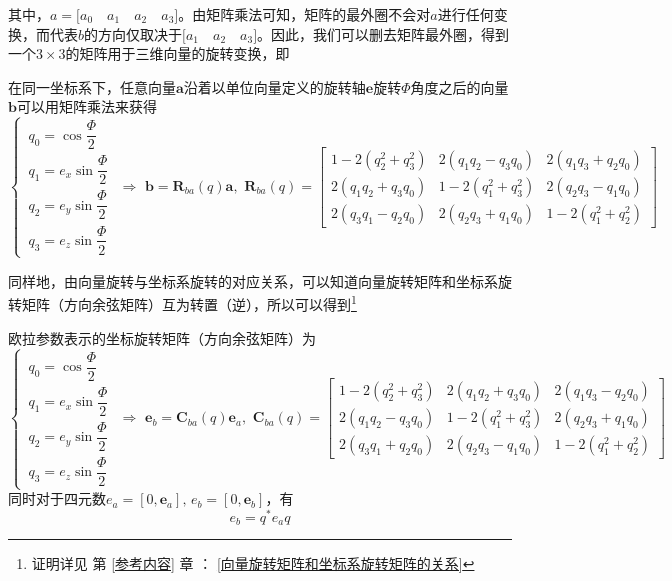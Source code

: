 其中，$a = \big[a_0 \quad a_1 \quad a_2 \quad a_3 \big]$。由矩阵乘法可知，矩阵的最外圈不会对$a$进行任何变换，而代表$b$的方向仅取决于$\big[a_1 \quad a_2 \quad a_3 \big]$。因此，我们可以删去矩阵最外圈，得到一个$3 \times 3$的矩阵用于三维向量的旋转变换，即

{
	在同一坐标系下，任意向量$\bm{a}$沿着以单位向量定义的旋转轴$\bm{e}$旋转$\varPhi$角度之后的向量$\bm{b}$可以用矩阵乘法来获得
	\begin{equation}
		\begin{cases}
			\, q_0 = \cos \dfrac{\varPhi}{2}\\[0.5em]
			\, q_1 = e_x \sin \dfrac{\varPhi}{2} \\[0.5em]
			\, q_2 = e_y \sin \dfrac{\varPhi}{2}\\[0.5em]
			\, q_3 = e_z \sin \dfrac{\varPhi}{2}
		\end{cases}
		\,\, \Longrightarrow \,\,
		\bm{b} = 
		\bm{R}_{ba}(q)
	\bm{a},
	\,\,
	\bm{R}_{ba}(q) = 
	\begin{bmatrix}
		1 - 2(q_2^2 + q_3^2) & 2(q_1q_2 - q_3q_0) & 2(q_1q_3 + q_2q_0)\\
		2(q_1q_2 + q_3q_0)  & 1 - 2(q_1^2 + q_3^2) & 2(q_2q_3 - q_1q_0) \\
		2(q_3q_1 - q_2q_0)& 2(q_2q_3 +q_1q_0) & 1 - 2(q_1^2 + q_2^2)
	\end{bmatrix}
	\end{equation}
}

同样地，由向量旋转与坐标系旋转的对应关系，可以知道向量旋转矩阵和坐标系旋转矩阵（方向余弦矩阵）互为转置（逆），所以可以得到\footnote[1]{证明详见 第 \ref{参考内容} 章 ： \ref{向量旋转矩阵和坐标系旋转矩阵的关系} \link[向量旋转矩阵和坐标系旋转矩阵的关系]}

{
	欧拉参数表示的坐标旋转矩阵（方向余弦矩阵）为
	\begin{equation}
		\begin{cases}
			\, q_0 = \cos \dfrac{\varPhi}{2}\\[0.5em]
			\, q_1 = e_x \sin \dfrac{\varPhi}{2} \\[0.5em]
			\, q_2 = e_y \sin \dfrac{\varPhi}{2}\\[0.5em]
			\, q_3 = e_z \sin \dfrac{\varPhi}{2}
		\end{cases}
		\,\, \Longrightarrow \,\,
		\bm{e}_b = 
		\bm{C}_{ba}(q)
		\bm{e}_a,
		\,\,
		\bm{C}_{ba}(q) = 
		\begin{bmatrix}
			1 - 2(q_2^2 + q_3^2) & 2(q_1q_2 + q_3q_0) & 2(q_1q_3 - q_2q_0)\\
			2(q_1q_2 - q_3q_0)  & 1 - 2(q_1^2 + q_3^2) & 2(q_2q_3 + q_1q_0) \\
			2(q_3q_1 + q_2q_0)& 2(q_2q_3 - q_1q_0) & 1 - 2(q_1^2 + q_2^2)
		\end{bmatrix}
	\end{equation}
	同时对于四元数$e_a = [0, \bm{e}_a],\, e_b = [0, \bm{e}_b]$，有
	\begin{equation}
		e_b = q^* e_a q
	\end{equation}
}

